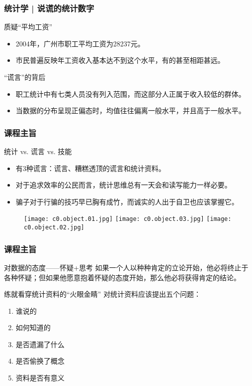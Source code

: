 \begin{frame}
  \frametitle{统计学 | 说谎的统计数字}
  \begin{block}{质疑“平均工资”}
    \begin{itemize}
      \item 2004年，广州市职工平均工资为28237元。
      \item 市民普遍反映年工资收入基本达不到这个水平，有的甚至相距甚远。
    \end{itemize}
  \end{block}
  \pause \pause \pause \pause
  \begin{block}{“谎言”的背后}
    \begin{itemize}
      \item 职工统计中有七类人员没有列入范围，而这部分人正属于收入较低的群体。
      \item 当数据的分布呈现正偏态时，均值往往偏离一般水平，并且高于一般水平。
    \end{itemize}
  \end{block}
\end{frame}

\begin{frame}[fragile]
  \frametitle{课程主旨}
  \begin{block}{统计 vs. 谎言 vs. 技能}
    \begin{itemize}
      \item 有3种谎言：谎言、糟糕透顶的谎言和统计资料。
      \item 对于追求效率的公民而言，统计思维总有一天会和读写能力一样必要。
      \item 骗子对于行骗的技巧早已胸有成竹，而诚实的人出于自卫也应该掌握它。
    \end{itemize}
  \end{block}
  \pause
  \vspace{-0.5em}
  \begin{figure}
    \centering
    \texttt{[image: c0.object.01.jpg]}
    \texttt{[image: c0.object.03.jpg]}
    \texttt{[image: c0.object.02.jpg]}
  \end{figure}
\end{frame}

\begin{frame}
  \frametitle{课程主旨}
  \begin{block}{对数据的态度——怀疑+思考}
    如果一个人以种种肯定的立论开始，他必将终止于各种怀疑；但如果他愿意抱着怀疑的态度开始，那么他必将获得肯定的结论。
  \end{block}
  \pause
  \begin{block}{练就看穿统计资料的“火眼金睛”}
    对统计资料应该提出五个问题：
    \begin{enumerate}
      \item 谁说的
      \item 如何知道的
      \item 是否遗漏了什么
      \item 是否偷换了概念
      \item 资料是否有意义
    \end{enumerate}
  \end{block}
\end{frame}

